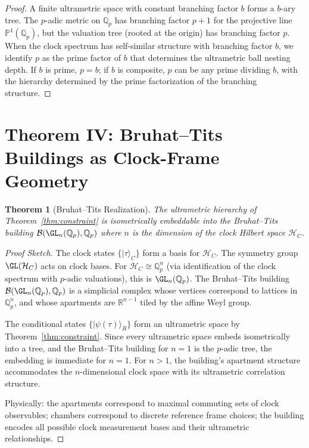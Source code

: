 \documentclass[12pt,a4paper]{article}
\newtheorem{theorem}{Theorem}[section]
\newcommand{\R}{\mathbb{R}}
\newcommand{\Qp}{\mathbb{Q}_p}
\newcommand{\cH}{\mathcal{H}}
\newcommand{\cB}{\mathcal{B}}
\newcommand{\ket}[1]{|#1\rangle}
\begin{document}
\begin{proof}
A finite ultrametric space with constant branching factor $b$ forms a $b$-ary tree. The $p$-adic metric on $\Qp$ has branching factor $p+1$ for the projective line $\mathbb{P}^1(\Qp)$, but the valuation tree (rooted at the origin) has branching factor $p$. When the clock spectrum has self-similar structure with branching factor $b$, we identify $p$ as the prime factor of $b$ that determines the ultrametric ball nesting depth. If $b$ is prime, $p=b$; if $b$ is composite, $p$ can be any prime dividing $b$, with the hierarchy determined by the prime factorization of the branching structure.
\end{proof}

\section{Theorem IV: Bruhat--Tits Buildings as Clock-Frame Geometry}

\begin{theorem}[Bruhat--Tits Realization]\label{thm:bruhat-tits}
The ultrametric hierarchy of Theorem~\ref{thm:constraint} is isometrically embeddable into the Bruhat--Tits building $\cB(\GL_n(\Qp), \Qp)$ where $n$ is the dimension of the clock Hilbert space $\cH_C$.
\end{theorem}

\begin{proof}[Proof Sketch]
The clock states $\{\ket{\tau}_C\}$ form a basis for $\cH_C$. The symmetry group $\GL(\cH_C)$ acts on clock bases. For $\cH_C \cong \Qp^n$ (via identification of the clock spectrum with $p$-adic valuations), this is $\GL_n(\Qp)$. The Bruhat--Tits building $\cB(\GL_n(\Qp),\Qp)$ is a simplicial complex whose vertices correspond to lattices in $\Qp^n$, and whose apartments are $\R^{n-1}$ tiled by the affine Weyl group.

The conditional states $\{\ket{\psi(\tau)}_R\}$ form an ultrametric space by Theorem~\ref{thm:constraint}. Since every ultrametric space embeds isometrically into a tree, and the Bruhat--Tits building for $n=1$ is the $p$-adic tree, the embedding is immediate for $n=1$. For $n>1$, the building's apartment structure accommodates the $n$-dimensional clock space with its ultrametric correlation structure.

Physically: the apartments correspond to maximal commuting sets of clock observables; chambers correspond to discrete reference frame choices; the building encodes all possible clock measurement bases and their ultrametric relationships.
\end{proof}
\end{document}
